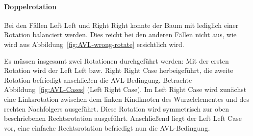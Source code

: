 \paragraph{Doppelrotation}

Bei den Fällen Left Left und Right Right konnte der Baum mit lediglich
einer Rotation balanciert werden.
Dies reicht bei den anderen Fällen nicht aus, wie wird aus Abbildung~\ref{fig:AVL-wrong-rotate}
ersichtlich wird.

Es müssen insgesamt zwei Rotationen durchgeführt werden:
Mit der ersten Rotation wird der Left Left bzw. Right Right Case
herbeigeführt, die zweite Rotation befriedigt anschließen die AVL-Bedingung.
Betrachte Abbildung~\ref{fig:AVL-Cases} (Left Right Case).
Im Left Right Case wird zunächst eine Linksrotation zwischen dem linken
Kindknoten des Wurzelelementes und des rechten Nachfolgers ausgeführt.
Diese Rotation wird symmetrisch zur oben beschriebenen Rechtsrotation ausgeführt.
Anschließend liegt der Left Left Case vor, eine einfache Rechtsrotation
befriedigt nun die AVL-Bedingung.


